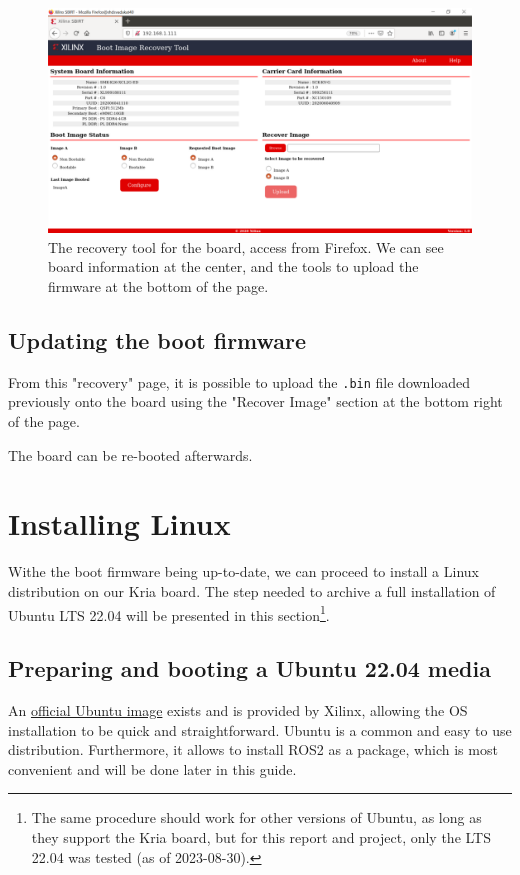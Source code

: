 \documentclass[10pt]{article}
\begin{document}
\begin{figure}[htbp]
\centering
\includegraphics[width=1\textwidth]{img/recovery.png}
\caption{\label{fig:orgeca2352}The recovery tool for the board, access from Firefox. We can see board information at the center, and the tools to upload the firmware at the bottom of the page.}
\end{figure}

\subsection{Updating the boot firmware}
\label{sec:orgb64b203}
From this "recovery" page, it is possible to upload the \texttt{.bin} file downloaded previously onto
the board using the "Recover Image" section at the bottom right of the page.

The board can be re-booted afterwards.

\section{Installing Linux}
\label{sec:org14e81c2}
Withe the boot firmware being up-to-date, we can proceed to install a Linux distribution
on our Kria board. The step needed to archive a full installation of Ubuntu LTS 22.04
will be presented in this section\footnote{The same procedure should work for other versions of Ubuntu, as long as they
support the Kria board, but for this report and project, only the LTS 22.04 was tested
(as of 2023-08-30).}.

\subsection{Preparing and booting a Ubuntu 22.04 media}
\label{sec:org36952c3}
An \href{https://ubuntu.com/download/amd-xilinx}{official Ubuntu image} exists and is
provided by Xilinx, allowing the OS installation to be quick and
straightforward.
Ubuntu is a common and easy to use distribution. Furthermore,
it allows to install ROS2 as a package, which is most convenient and will be
done later in this guide.
\end{document}
